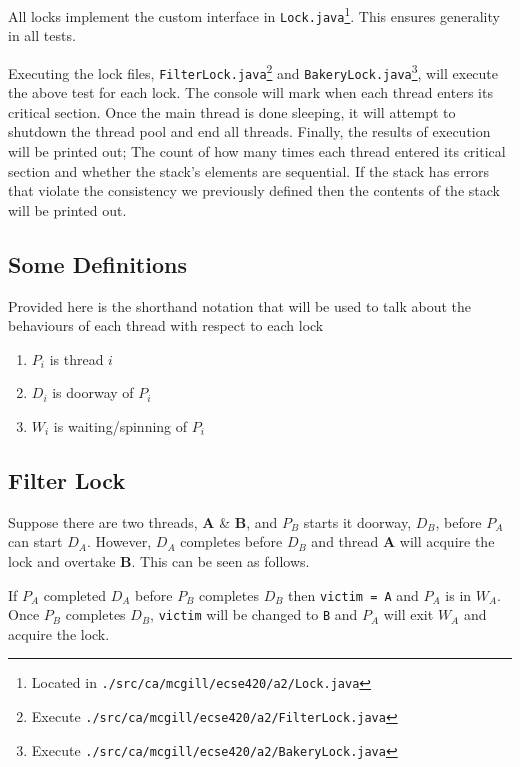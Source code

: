 \documentclass[12pt,letterpaper,titlepage]{article}
\begin{document}
    All locks implement the custom interface in \texttt{Lock.java}\footnote{Located in \texttt{./src/ca/mcgill/ecse420/a2/Lock.java}}. This ensures generality in all tests.
    
    Executing the lock files, \texttt{FilterLock.java}\footnote{Execute \texttt{./src/ca/mcgill/ecse420/a2/FilterLock.java}} and \texttt{BakeryLock.java}\footnote{Execute \texttt{./src/ca/mcgill/ecse420/a2/BakeryLock.java}}, will execute the above test for each lock. The console will mark when each thread enters its critical section. Once the main thread is done sleeping, it will attempt to shutdown the thread pool and end all threads. Finally, the results of execution will be printed out; The count of how many times each thread entered its critical section and whether the stack's elements are sequential. If the stack has errors that violate the consistency we previously defined then the contents of the stack will be printed out.
    
   \subsection{Some Definitions}
    Provided here is the shorthand notation that will be used to talk about the behaviours of each thread with respect to each lock
   \begin{enumerate}
     \itemsep 0em
     \item $P_i$ is thread $i$
     \item $D_i$ is doorway of $P_i$
     \item $W_i$ is waiting/spinning of $P_i$
   \end{enumerate}
    
   \subsection{Filter Lock}
    Suppose there are two threads, \textbf{A} \& \textbf{B}, and $P_B$ starts it doorway, $D_B$, before $P_A$ can start $D_A$. However, $D_A$ completes before $D_B$ and thread \textbf{A} will acquire the lock and overtake \textbf{B}. This can be seen as follows.
    
    If $P_A$ completed $D_A$ before $P_B$ completes $D_B$ then \texttt{victim = A} and $P_A$ is in $W_A$. Once $P_B$ completes $D_B$, \texttt{victim} will be changed to \texttt{B} and $P_A$ will exit $W_A$ and acquire the lock.
    
\end{document}
